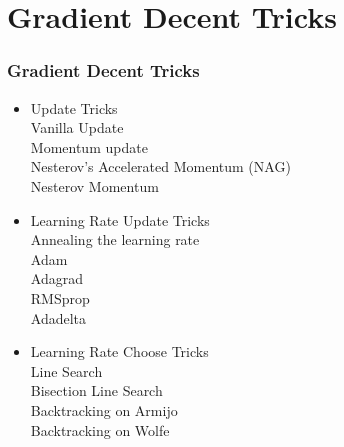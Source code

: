 
\ifx\allfiles\undefined

\fi
\section{Gradient Decent Tricks}
\begin{frame}
\frametitle{Gradient Decent Tricks}
	\scriptsize
	\begin{itemize}
		\item Update Tricks\\
			\hspace{1cm}Vanilla Update\\
			\hspace{1cm} Momentum update\\
		 	\hspace{1cm} Nesterov’s Accelerated Momentum (NAG)\\
			\hspace{1cm} Nesterov Momentum\\
		\item Learning Rate Update Tricks\\
			\hspace{1cm} Annealing the learning rate\\
		 	\hspace{1cm} Adam \\
		 	\hspace{1cm} Adagrad\\
		 	\hspace{1cm} RMSprop \\
		 	\hspace{1cm} Adadelta \\
		\item Learning Rate Choose Tricks\\
			\hspace{1cm} Line Search\\
			\hspace{1cm} Bisection Line Search\\
			\hspace{1cm} Backtracking on Armijo\\
			\hspace{1cm} Backtracking on Wolfe\\
	\end{itemize}
\end{frame}
\ifx\allfiles\undefined

\fi
